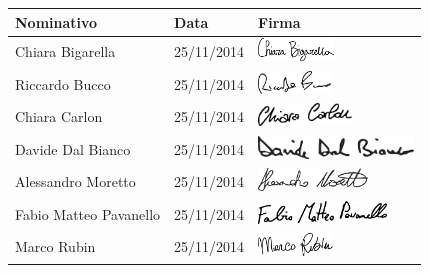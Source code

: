 	\begin{center}
	\begin{tabu} to \textwidth {|X[4]|X[2c]|X[5]|}
	\hline
     Nominativo & Data & Firma \\ \hline
     Chiara Bigarella & 25/11/2014 & \includegraphics[height=6mm]{Commons/Pics/Signatures/Bigarella.pdf}  \\ \hline
     Riccardo Bucco & 25/11/2014 & \includegraphics[height=6mm]{Commons/Pics/Signatures/Bucco.pdf}\\ \hline
     Chiara Carlon & 25/11/2014 & \includegraphics[height=6mm]{Commons/Pics/Signatures/Carlon.pdf}\\ \hline
     Davide Dal Bianco & 25/11/2014 &\includegraphics[height=6mm]{Commons/Pics/Signatures/DalBianco.pdf} \\ \hline
     Alessandro Moretto & 25/11/2014 &\includegraphics[height=6mm]{Commons/Pics/Signatures/Moretto.pdf} \\ \hline
     Fabio Matteo Pavanello & 25/11/2014 & \includegraphics[height=6mm]{Commons/Pics/Signatures/Pavanello.pdf}\\ \hline
     Marco Rubin & 25/11/2014 & \includegraphics[height=6mm]{Commons/Pics/Signatures/Rubin.pdf} \\ \hline
     \end{tabu}
	\end{center}
